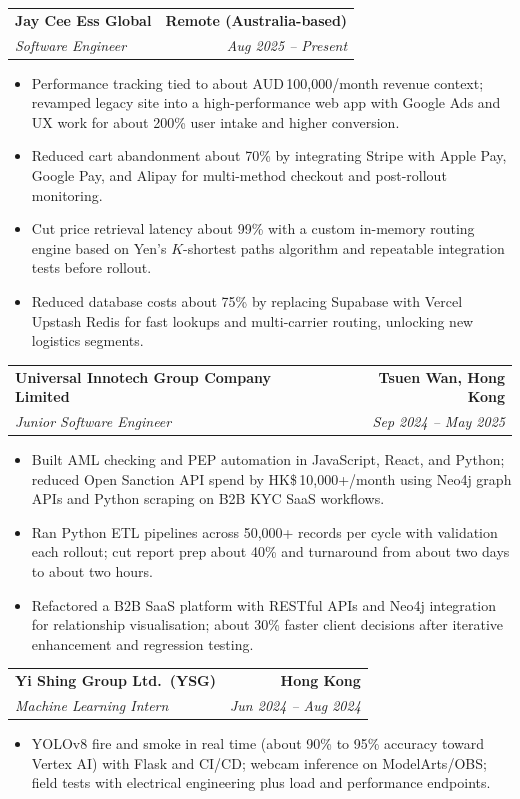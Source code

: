 \documentclass[9pt,a4paper]{article}
\makeatletter
\newcommand{\resumeSubheading}[4]{%
  \vspace{0.6em}%
  \begin{tabular*}{\textwidth}{l@{\extracolsep{\fill}}r}
    \textbf{#1} & \textbf{#2} \\
    \textit{\small #3} & \textit{\small #4} \\
  \end{tabular*}\vspace{0.32em}}
\makeatother
\begin{document}
\resumeSubheading{Jay Cee Ess Global}{Remote (Australia-based)}{Software Engineer}{Aug 2025 -- Present}
\begin{itemize}
  \item Performance tracking tied to about AUD\,100{,}000/month revenue context; revamped legacy site into a high-performance web app with Google Ads and UX work for about 200\% user intake and higher conversion.
  \item Reduced cart abandonment about 70\% by integrating Stripe with Apple Pay, Google Pay, and Alipay for multi-method checkout and post-rollout monitoring.
  \item Cut price retrieval latency about 99\% with a custom in-memory routing engine based on Yen's $K$-shortest paths algorithm and repeatable integration tests before rollout.
  \item Reduced database costs about 75\% by replacing Supabase with Vercel Upstash Redis for fast lookups and multi-carrier routing, unlocking new logistics segments.
\end{itemize}

\resumeSubheading{Universal Innotech Group Company Limited}{Tsuen Wan, Hong Kong}{Junior Software Engineer}{Sep 2024 -- May 2025}
\begin{itemize}
  \item Built AML checking and PEP automation in JavaScript, React, and Python; reduced Open Sanction API spend by HK\$\,10{,}000+/month using Neo4j graph APIs and Python scraping on B2B KYC SaaS workflows.
  \item Ran Python ETL pipelines across 50{,}000+ records per cycle with validation each rollout; cut report prep about 40\% and turnaround from about two days to about two hours.
  \item Refactored a B2B SaaS platform with RESTful APIs and Neo4j integration for relationship visualisation; about 30\% faster client decisions after iterative enhancement and regression testing.
\end{itemize}

\resumeSubheading{Yi Shing Group Ltd.\ (YSG)}{Hong Kong}{Machine Learning Intern}{Jun 2024 -- Aug 2024}
\begin{itemize}
  \item YOLOv8 fire and smoke in real time (about 90\% to 95\% accuracy toward Vertex AI) with Flask and CI/CD; webcam inference on ModelArts/OBS; field tests with electrical engineering plus load and performance endpoints.
\end{itemize}
\end{document}
